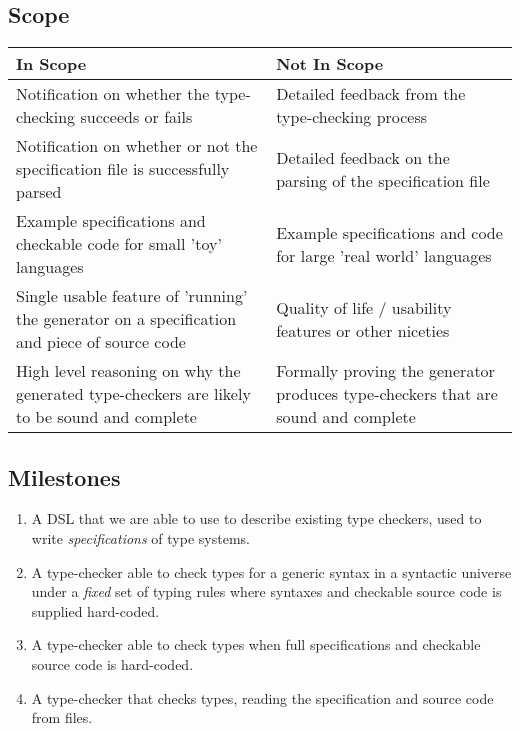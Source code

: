   \subsection{Scope}
  \label{sec-scope}

  \begin{center}
  \begin{tabular}{p{20em}|p{18em}}
    \large In Scope & \large Not In Scope \\ \hline \hline
    Notification on whether the type-checking succeeds
    or fails
    & Detailed feedback from the type-checking process \\ \hline
    Notification on whether or not the specification file is
    successfully parsed
    & Detailed feedback on the parsing of the specification file \\ \hline
    Example specifications and checkable code for small 'toy' languages
    & Example specifications and code for large 'real world' languages \\ \hline
    Single usable feature of 'running' the generator on a
    specification and piece of source code
    & Quality of life / usability features or other niceties \\ \hline
    High level reasoning on why the generated type-checkers
    are likely to be sound and complete
    & Formally proving the generator produces type-checkers
    that are sound and complete\\
  \end{tabular}            
  \end{center}        
  
  \subsection{Milestones}
  \label{section-milestones}

  \begin{enumerate}
  \item A DSL that we are able to use to describe existing
    type checkers, used to write \emph{specifications} of type systems.
  \item A type-checker able to check types for a generic syntax
    in a syntactic universe under a \emph{fixed} set of typing rules
    where syntaxes and checkable source code is supplied hard-coded.
  \item A type-checker able to check types when full specifications
    and checkable source code is hard-coded.
  \item A type-checker  that checks types, reading
    the specification and source code from files.
  \end{enumerate}
  
